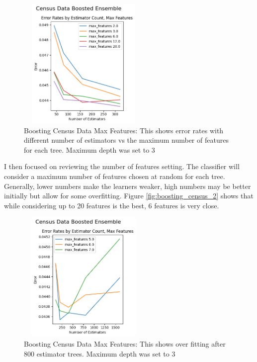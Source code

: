 \documentclass[letterpaper]{article} %
\begin{document}
\begin{figure}[htb]
\centering
\includegraphics[width=2.5in, height=2.5in]{figures/Census_Data_Boosting_Estimator_Count_by_Max_Depth_boosting_2.png}
\caption{Boosting Census Data Max Features:  This shows error rates with different number of estimators vs the maximum number of features for each tree. Maximum depth was set to 3  }
\label{fig:boosting_census_1}
\end{figure}


I then focused on reviewing the number of features setting.  The classifier will consider a maximum number of features chosen at random for each tree.  Generally, lower numbers make the learners weaker, high numbers may be better initially but allow for some overfitting. Figure \ref{fig:boosting_census_2}  shows that while considering up to 20 features is the best, 6 features is very close.


\begin{figure}[htb]
\centering
\includegraphics[width=2.5in, height=2.5in]{figures/Census_Data_Boosting_Estimator_Count_by_Max_Depth_boosting_3.png}
\caption{Boosting Census Data Max Features:  This shows over fitting after 800 estimator trees.  Maximum depth was set to 3  }
\label{fig:boosting_census_3}
\end{figure}
\end{document}
